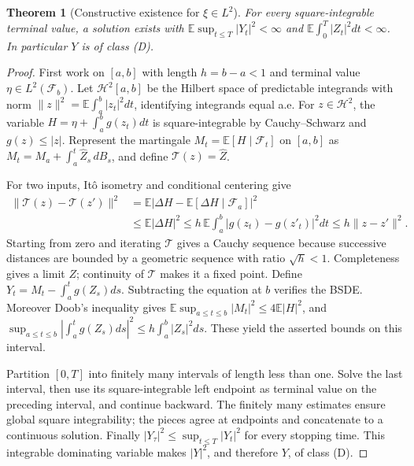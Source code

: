 \documentclass[11pt,a4paper]{article}
\newcommand{\E}{\mathbb E}
\newcommand{\F}{\mathcal F}
\newtheorem{theorem}{Theorem}
\theoremstyle{definition}
\begin{document}
\begin{theorem}[Constructive existence for $\xi\in L^2$]
For every square-integrable terminal value, a solution exists with
$\E\sup_{t\le T}|Y_t|^2<\infty$ and $\E\int_0^T|Z_t|^2dt<\infty$. In particular $Y$ is of class (D).
\end{theorem}
\begin{proof}
First work on $[a,b]$ with length $h=b-a<1$ and terminal value $\eta\in L^2(\F_b)$. Let $\mathcal H^2[a,b]$ be the Hilbert space of predictable integrands with norm
$\|z\|^2=\E\int_a^b|z_t|^2dt$, identifying integrands equal a.e. For $z\in\mathcal H^2$, the variable
$H=\eta+\int_a^b g(z_t)dt$ is square-integrable by Cauchy--Schwarz and $g(z)\le|z|$. Represent the martingale $M_t=\E[H\mid\F_t]$ on $[a,b]$ as
$M_t=M_a+\int_a^t\widehat Z_s\,dB_s$, and define $\mathcal T(z)=\widehat Z$.

For two inputs, It\^o isometry and conditional centering give
\begin{align*}
 \|\mathcal T(z)-\mathcal T(z')\|^2
 &=\E\left|\Delta H-\E[\Delta H\mid\F_a]\right|^2\\
 &\le\E|\Delta H|^2
 \le h\,\E\int_a^b|g(z_t)-g(z'_t)|^2dt
 \le h\|z-z'\|^2.
\end{align*}
Starting from zero and iterating $\mathcal T$ gives a Cauchy sequence because successive distances are bounded by a geometric sequence with ratio $\sqrt h<1$. Completeness gives a limit $Z$; continuity of $\mathcal T$ makes it a fixed point. Define
$Y_t=M_t-\int_a^tg(Z_s)ds$. Subtracting the equation at $b$ verifies the BSDE. Moreover Doob's inequality gives
$\E\sup_{a\le t\le b}|M_t|^2\le4\E|H|^2$, and
$\sup_{a\le t\le b}|\int_a^tg(Z_s)ds|^2\le h\int_a^b|Z_s|^2ds$.
These yield the asserted bounds on this interval.

Partition $[0,T]$ into finitely many intervals of length less than one. Solve the last interval, then use its square-integrable left endpoint as terminal value on the preceding interval, and continue backward. The finitely many estimates ensure global square integrability; the pieces agree at endpoints and concatenate to a continuous solution. Finally
$|Y_\tau|^2\le\sup_{t\le T}|Y_t|^2$ for every stopping time. This integrable dominating variable makes $|Y|^2$, and therefore $Y$, of class (D).
\end{proof}
\end{document}
